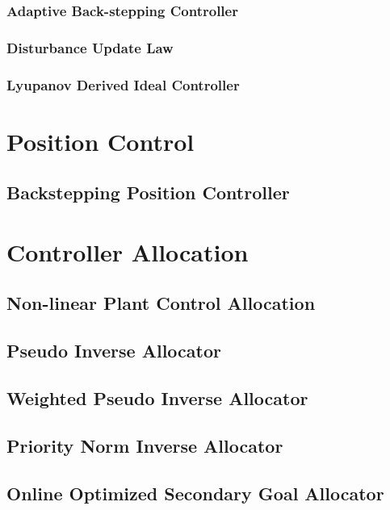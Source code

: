 \subsubsection{Adaptive Back-stepping Controller}
\label{subsubsec:control.attitude.nonlinear.backstep}
\subsubsection*{Disturbance Update Law}
\subsubsection{Lyupanov Derived Ideal Controller}

\section{Position Control}
\label{sec:control.position}
\subsection{Backstepping Position Controller}
\label{subsec:control.position.bacstepping}

\section{Controller Allocation}
\label{sec:control.allocation}
\subsection{Non-linear Plant Control Allocation}
\label{subsec:control.allocation.allocators}
\subsection{Pseudo Inverse Allocator}
\subsection{Weighted Pseudo Inverse Allocator}
\subsection{Priority Norm Inverse Allocator}
\subsection{Online Optimized Secondary Goal Allocator}
